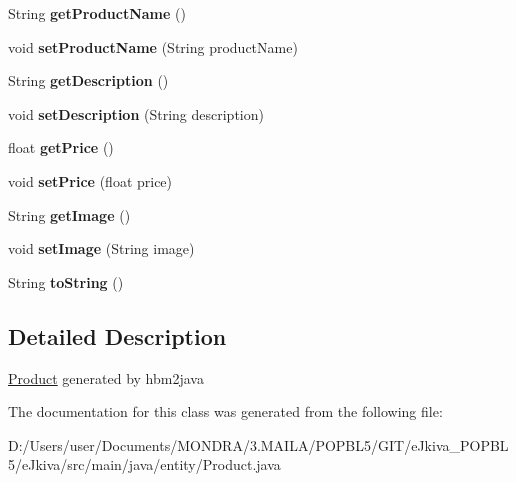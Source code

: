 \begin{DoxyCompactItemize}
String {\bfseries get\+Product\+Name} ()
\item 
\mbox{\label{classentity_1_1_product_abbed2e3b34beb9eff42595b8e2641f7a}} 
void {\bfseries set\+Product\+Name} (String product\+Name)
\item 
\mbox{\label{classentity_1_1_product_a33ba8df9ce2e2cbf6091bb97a0ee0f2c}} 
String {\bfseries get\+Description} ()
\item 
\mbox{\label{classentity_1_1_product_a275f824222328131f6a00f383196da41}} 
void {\bfseries set\+Description} (String description)
\item 
\mbox{\label{classentity_1_1_product_af6bbc7b34e0ab7b7f2fe758d174fa5f4}} 
float {\bfseries get\+Price} ()
\item 
\mbox{\label{classentity_1_1_product_a096085200f5ea9730661bc114a0f929d}} 
void {\bfseries set\+Price} (float price)
\item 
\mbox{\label{classentity_1_1_product_a5466888d66016874eb475a2703cbc709}} 
String {\bfseries get\+Image} ()
\item 
\mbox{\label{classentity_1_1_product_a02b293f40f4d82e30617fdc2be6fac49}} 
void {\bfseries set\+Image} (String image)
\item 
\mbox{\label{classentity_1_1_product_ad77da4f2b6b67974fd2a040e2b930970}} 
String {\bfseries to\+String} ()
\end{DoxyCompactItemize}


\subsection{Detailed Description}
\mbox{\hyperlink{classentity_1_1_product}{Product}} generated by hbm2java 

The documentation for this class was generated from the following file\+:\begin{DoxyCompactItemize}
\item 
D\+:/\+Users/user/\+Documents/\+M\+O\+N\+D\+R\+A/3.\+M\+A\+I\+L\+A/\+P\+O\+P\+B\+L5/\+G\+I\+T/e\+Jkiva\+\_\+\+P\+O\+P\+B\+L5/e\+Jkiva/src/main/java/entity/Product.\+java\end{DoxyCompactItemize}

